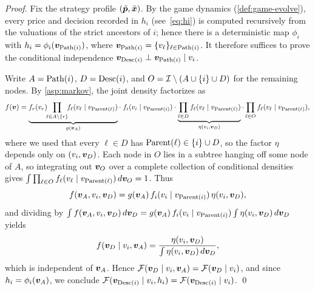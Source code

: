 \begin{proof}
Fix the strategy profile $(\tilde{{\bm{p}}}, \tilde{{\bm{x}}})$. By the game dynamics (\cref{def:game-evolve}), every price and decision recorded in $h_i$ (see~\eqref{eq:hi}) is computed recursively from the valuations of the strict ancestors of $i$; hence there is a deterministic map $\phi_i$ with $h_i = \phi_i({\bm{v}}_{\operatorname{Path}(i)})$, where ${\bm{v}}_{\operatorname{Path}(i)} = \{v_\ell\}_{\ell \in \operatorname{Path}(i)}$. It therefore suffices to prove the conditional independence ${\bm{v}}_{\operatorname{Desc}(i)} \perp {\bm{v}}_{\operatorname{Path}(i)} \mid v_i$.

Write $A = \operatorname{Path}(i)$, $D = \operatorname{Desc}(i)$, and $O = \mathcal{I} \setminus (A \cup \{i\} \cup D)$ for the remaining nodes. By \cref{asp:markov}, the joint density factorizes as
\[
f({\bm{v}}) = \underbrace{f_r(v_r)\!\!\prod_{\ell \in A \setminus \{r\}}\!\! f_\ell(v_\ell \mid v_{\operatorname{Parent}(\ell)})}_{g({\bm{v}}_A)} \cdot\; f_i(v_i \mid v_{\operatorname{Parent}(i)}) \cdot \underbrace{\prod_{\ell \in D} f_\ell(v_\ell \mid v_{\operatorname{Parent}(\ell)})}_{\eta(v_i, {\bm{v}}_D)} \cdot \prod_{\ell \in O} f_\ell(v_\ell \mid v_{\operatorname{Parent}(\ell)}),
\]
where we used that every $\ell \in D$ has $\operatorname{Parent}(\ell) \in \{i\} \cup D$, so the factor $\eta$ depends only on $(v_i, {\bm{v}}_D)$. Each node in $O$ lies in a subtree hanging off some node of $A$, so integrating out ${\bm{v}}_O$ over a complete collection of conditional densities gives $\int \prod_{\ell \in O} f_\ell(v_\ell \mid v_{\operatorname{Parent}(\ell)}) \, d{\bm{v}}_O = 1$. Thus
\[
f({\bm{v}}_A, v_i, {\bm{v}}_D) = g({\bm{v}}_A)\, f_i(v_i \mid v_{\operatorname{Parent}(i)})\, \eta(v_i, {\bm{v}}_D),
\]
and dividing by $\int f({\bm{v}}_A, v_i, {\bm{v}}_D)\, d{\bm{v}}_D = g({\bm{v}}_A)\, f_i(v_i \mid v_{\operatorname{Parent}(i)}) \int \eta(v_i, {\bm{v}}_D)\, d{\bm{v}}_D$ yields
\[
f({\bm{v}}_D \mid v_i, {\bm{v}}_A) = \frac{\eta(v_i, {\bm{v}}_D)}{\int \eta(v_i, {\bm{v}}_D)\, d{\bm{v}}_D},
\]
which is independent of ${\bm{v}}_A$. Hence $\mathcal{F}({\bm{v}}_D \mid v_i, {\bm{v}}_A) = \mathcal{F}({\bm{v}}_D \mid v_i)$, and since $h_i = \phi_i({\bm{v}}_A)$, we conclude $\mathcal{F}({\bm{v}}_{\operatorname{Desc}(i)} \mid v_i, h_i) = \mathcal{F}({\bm{v}}_{\operatorname{Desc}(i)} \mid v_i)$.
\qed
\end{proof}
